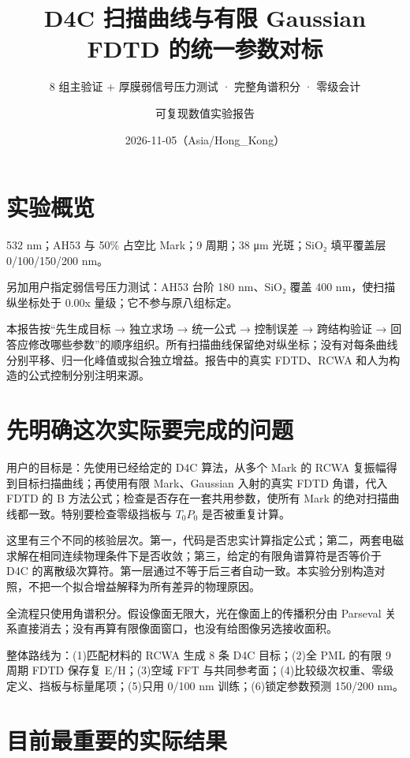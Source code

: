 \documentclass[
  chinese,
  UTF8,
  a4paper,
  11pt]{ctexart}
\title{D4C 扫描曲线与有限 Gaussian FDTD 的统一参数对标}
\subtitle{8 组主验证 + 厚膜弱信号压力测试 · 完整角谱积分 · 零级会计}
\author{可复现数值实验报告}
\date{2026-11-05（Asia/Hong\_Kong）}
\begin{document}
\maketitle

{
\setcounter{tocdepth}{2}
\tableofcontents
}
\section{实验概览}\label{ux5b9eux9a8cux6982ux89c8}

532 nm；AH53 与 50\% 占空比 Mark；9 周期；38 μm 光斑；SiO₂ 填平覆盖层
0/100/150/200 nm。

另加用户指定弱信号压力测试：AH53 台阶 180 nm、SiO₂ 覆盖 400
nm，使扫描纵坐标处于 0.00x 量级；它不参与原八组标定。

本报告按``先生成目标 → 独立求场 → 统一公式 → 控制误差 → 跨结构验证 →
回答应修改哪些参数''的顺序组织。所有扫描曲线保留绝对纵坐标；没有对每条曲线分别平移、归一化峰值或拟合独立增益。报告中的真实
FDTD、RCWA 和人为构造的公式控制分别注明来源。

\section{先明确这次实际要完成的问题}\label{ux5148ux660eux786eux8fd9ux6b21ux5b9eux9645ux8981ux5b8cux6210ux7684ux95eeux9898}

用户的目标是：先使用已经给定的 D4C 算法，从多个 Mark 的 RCWA
复振幅得到目标扫描曲线；再使用有限 Mark、Gaussian 入射的真实 FDTD
角谱，代入 FDTD 的 B 方法公式；检查是否存在一套共用参数，使所有 Mark
的绝对扫描曲线都一致。特别要检查零级挡板与 \(T_0P_0\) 是否被重复计算。

这里有三个不同的核验层次。第一，代码是否忠实计算指定公式；第二，两套电磁求解在相同连续物理条件下是否收敛；第三，给定的有限角谱算符是否等价于
D4C
的离散级次算符。第一层通过不等于后三者自动一致。本实验分别构造对照，不把一个拟合增益解释为所有差异的物理原因。

全流程只使用角谱积分。假设像面无限大，光在像面上的传播积分由 Parseval
关系直接消去；没有再算有限像面窗口，也没有给图像另选接收面积。

整体路线为：(1)匹配材料的 RCWA 生成 8 条 D4C 目标；(2)全 PML 的有限 9
周期 FDTD 保存复 E/H；(3)空域 FFT
与共同参考面；(4)比较级次权重、零级定义、挡板与标量尾项；(5)只用 0/100
nm 训练；(6)锁定参数预测 150/200 nm。

\section{目前最重要的实际结果}\label{ux76eeux524dux6700ux91cdux8981ux7684ux5b9eux9645ux7ed3ux679c}
\end{document}
